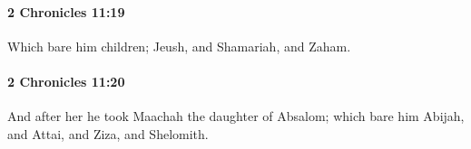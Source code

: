 		\paragraph{2 Chronicles 11:19} %
			\label{2CHRONICLES-11-19}

			Which bare him children; Jeush, and Shamariah, and Zaham.


		\paragraph{2 Chronicles 11:20} %
			\label{2CHRONICLES-11-20}

			And after her he took Maachah the daughter of Absalom; which bare him Abijah, and Attai, and Ziza, and Shelomith.


